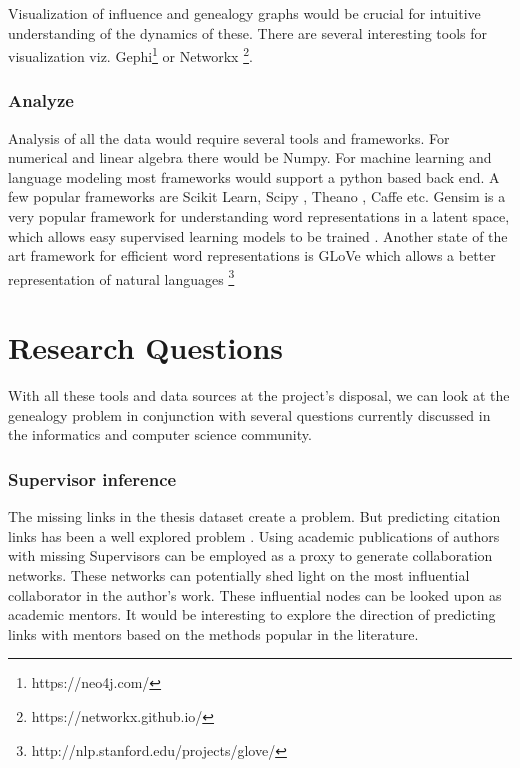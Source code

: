 \documentclass[a4paper]{article}
\begin{document}
Visualization of influence and genealogy graphs would be crucial for intuitive understanding of the dynamics of these. There are several interesting tools for visualization viz. Gephi\footnote{https://neo4j.com/} or Networkx \footnote{https://networkx.github.io/}.

\subsubsection{Analyze}
Analysis of all the data would require several tools and frameworks. For numerical and linear algebra there would be Numpy. For machine learning and language modeling most frameworks would support a python based back end. A few popular frameworks are Scikit Learn, Scipy , Theano , Caffe etc. Gensim is a very popular framework for understanding word representations in a latent space, which allows easy supervised learning models to be trained \cite{mikolov2013distributed}. Another state of the art framework for efficient word representations is GLoVe \cite{pennington2014glove} which allows a better representation of natural languages \footnote{http://nlp.stanford.edu/projects/glove/}

\section{Research Questions}
With all these tools and data sources at the project's disposal, we can look at the genealogy problem in conjunction with several questions currently discussed in the informatics and computer science community.

\subsubsection{Supervisor inference} The missing links in the thesis dataset create a problem. But predicting citation links has been a well explored problem \cite{ciotti2016homophily,arnold2009information,yu2012citation,liben2007link}. Using academic publications of authors with missing Supervisors can be employed as a proxy to generate collaboration networks. These networks can potentially shed light on the most influential collaborator in the author's work. These influential nodes can be looked upon as academic mentors. It would be interesting to explore the direction of predicting links with mentors based on the methods popular in the literature. 
\end{document}

